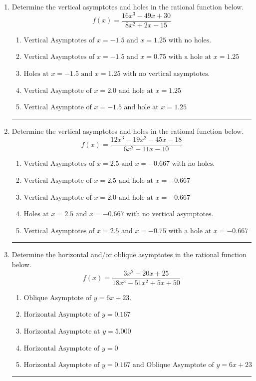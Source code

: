 \documentclass[14pt]{extbook}
\newcommand{\litem}[1]{\item#1\hspace*{-1cm}\rule{\textwidth}{0.4pt}}
\begin{document}
\begin{enumerate}
\litem{
Determine the vertical asymptotes and holes in the rational function below.\[ f(x) = \frac{16x^{3} -49 x + 30}{8x^{2} +2 x -15} \]\begin{enumerate}[label=\Alph*.]
\item \( \text{Vertical Asymptotes of } x = -1.5 \text{ and } x = 1.25 \text{ with no holes.} \)
\item \( \text{Vertical Asymptotes of } x = -1.5 \text{ and } x = 0.75 \text{ with a hole at } x = 1.25 \)
\item \( \text{Holes at } x = -1.5 \text{ and } x = 1.25 \text{ with no vertical asymptotes.} \)
\item \( \text{Vertical Asymptote of } x = 2.0 \text{ and hole at } x = 1.25 \)
\item \( \text{Vertical Asymptote of } x = -1.5 \text{ and hole at } x = 1.25 \)

\end{enumerate} }
\litem{
Determine the vertical asymptotes and holes in the rational function below.\[ f(x) = \frac{12x^{3} -19 x^{2} -45 x -18}{6x^{2} -11 x -10} \]\begin{enumerate}[label=\Alph*.]
\item \( \text{Vertical Asymptotes of } x = 2.5 \text{ and } x = -0.667 \text{ with no holes.} \)
\item \( \text{Vertical Asymptote of } x = 2.5 \text{ and hole at } x = -0.667 \)
\item \( \text{Vertical Asymptote of } x = 2.0 \text{ and hole at } x = -0.667 \)
\item \( \text{Holes at } x = 2.5 \text{ and } x = -0.667 \text{ with no vertical asymptotes.} \)
\item \( \text{Vertical Asymptotes of } x = 2.5 \text{ and } x = -0.75 \text{ with a hole at } x = -0.667 \)

\end{enumerate} }
\litem{
Determine the horizontal and/or oblique asymptotes in the rational function below.\[ f(x) = \frac{3x^{2} -20 x + 25}{18x^{3} -51 x^{2} +5 x + 50} \]\begin{enumerate}[label=\Alph*.]
\item \( \text{Oblique Asymptote of } y = 6x + 23. \)
\item \( \text{Horizontal Asymptote of } y = 0.167  \)
\item \( \text{Horizontal Asymptote at } y = 5.000 \)
\item \( \text{Horizontal Asymptote of } y = 0 \)
\item \( \text{Horizontal Asymptote of } y = 0.167 \text{ and Oblique Asymptote of } y = 6x + 23 \)


\end{enumerate}}
\end{enumerate}
\end{document}

